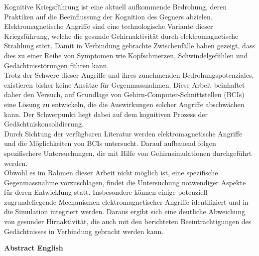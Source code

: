 Kognitive Kriegsf\"uhrung ist eine aktuell aufkommende Bedrohung, deren Praktiken auf die Beeinflussung der Kognition des Gegners abzielen. Elektromagnetische Angriffe sind eine technologische Variante dieser Kriegsf\"uhrung, welche die gesunde Gehirnaktivit\"at durch elektromagnetische Strahlung st\"ort. Damit in Verbindung gebrachte Zwischenf\"alle haben gezeigt, dass dies zu einer Reihe von Symptomen wie Kopfschmerzen, Schwindelgef\"uhlen und Ged\"achtnisst\"orungen f\"uhren kann.\\
Trotz der Schwere dieser Angriffe und ihres zunehmenden Bedrohungspotenziales, existieren bisher keine Ans\"atze f\"ur Gegenmassnahmen. Diese Arbeit beinhaltet daher den Versuch, auf Grundlage von Gehirn-Computer-Schnittstellen (BCIs) eine L\"osung zu entwickeln, die die Auswirkungen solcher Angriffe abschw\"achen kann. Der Schwerpunkt liegt dabei auf dem kognitiven Prozess der Ged\"achtniskonsolidierung.\\
Durch Sichtung der verf\"ugbaren Literatur werden elektromagnetische Angriffe und die M\"oglichkeiten von BCIs untersucht. Darauf aufbauend folgen spezifischere Untersuchungen, die mit Hilfe von Gehirnsimulationen durchgef\"uhrt werden.\\
Obwohl es im Rahmen dieser Arbeit nicht m\"oglich ist, eine spezifische Gegenmassnahme vorzuschlagen, findet die Untersuchung notwendiger Aspekte f\"ur deren Entwicklung statt. Insbesondere k\"onnen einige potenziell zugrundeliegende Mechanismen elektromagnetischer Angriffe identifiziert und in die Simulation integriert werden. Daraus ergibt sich eine deutliche Abweichung von gesunder Hirnaktivit\"at, die auch mit den berichteten Beeintr\"achtigungen des Ged\"achtnisses in Verbindung gebracht werden kann.


\newpage

\vspace*{50pt} %
{\Huge\bfseries Abstract English} %
\vspace*{40pt} %

